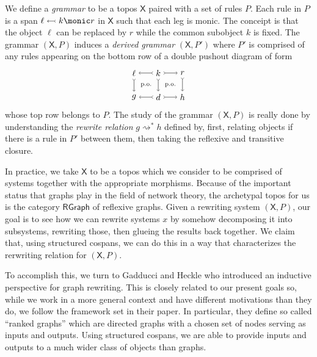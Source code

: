 \documentclass{amsart}
\newcommand{\X}{\cat{X}}
\newcommand{\RGraph}{\cat{RGraph}}
\newcommand{\cat}[1]{\mathsf{#1}}
\newcommand{\deriv}[2]{#1 \rightsquigarrow^\ast #2}
\newcommand{\monicgets}{\leftarrowtail}
\theoremstyle{remark}
\theoremstyle{definition}
\begin{document}
We define a \emph{grammar} to be a topos $ \X $ paired with a
set of rules $ P $.  Each rule in $ P $ is a span
$ \ell \monicgets k \monic r $ in $ \X $ such that each leg is monic.
The conceipt is that the object $ \ell $ can be replaced by $ r $
while the common subobject $ k $ is fixed.  The grammar $ ( \X , P ) $
induces a \emph{derived grammar} $ ( \X , P' ) $ where $ P' $ is
comprised of any rules appearing on the bottom row of a double pushout
diagram of form
%
\[
  \begin{tikzpicture}
    \node (1) at (0,1) {$ \ell $};
    \node (2) at (1,1) {$ k $};
    \node (3) at (2,1) {$ r $};
    \node (4) at (0,0) {$ g $};
    \node (5) at (1,0) {$ d $};
    \node (6) at (2,0) {$ h $};
    \draw [>->] (2) to node [] {\scriptsize{$  $}} (1);
    \draw [>->] (2) to node [] {\scriptsize{$  $}} (3);
    \draw [>->] (5) to node [] {\scriptsize{$  $}} (4);
    \draw [>->] (5) to node [] {\scriptsize{$  $}} (6);
    \draw [>->] (1) to node [] {\scriptsize{$  $}} (4);
    \draw [>->] (2) to node [] {\scriptsize{$  $}} (5);
    \draw [>->] (3) to node [] {\scriptsize{$  $}} (6);
    \node () at (0.5,0.5) {\scriptsize{p.o.}};
    \node () at (1.5,0.5) {\scriptsize{p.o.}};
  \end{tikzpicture}
\]
%
whose top row belongs to $ P $. The study of the grammar
$ ( \X , P ) $ is really done by understanding the \emph{rewrite
  relation} $ \deriv{g}{h} $ defined by, first, relating objects if
there is a rule in $ P' $ between them, then taking the reflexive and
transitive closure.

In practice, we take $ \X $ to be a topos which we consider to be
comprised of systems together with the appropriate morphisms.  Because
of the important status that graphs play in the field of network
theory, the archetypal topos for us is the category $ \RGraph $ of
reflexive graphs.  Given a rewriting system $ ( \X , P ) $, our goal
is to see how we can rewrite systems $ x $ by somehow decomposing it
into subsystems, rewriting those, then glueing the results back
together.  We claim that, using structured cospans, we can do this in
a way that characterizes the rerwriting relation for $ ( \X , P ) $.

To accomplish this, we turn to Gadducci and Heckle
\cite{Gadd_IndGraphTrans} who introduced an inductive perspective for
graph rewriting.  This is closely related to our present goals so,
while we work in a more general context and have different
motivations than they do, we follow the framework set in their
paper.  In particular, they define so called ``ranked graphs'' which
are directed graphs with a chosen set of nodes serving as inputs and
outputs.  Using structured cospans, we are able to provide inputs and
outputs to a much wider class of objects than graphs. 
\end{document}
